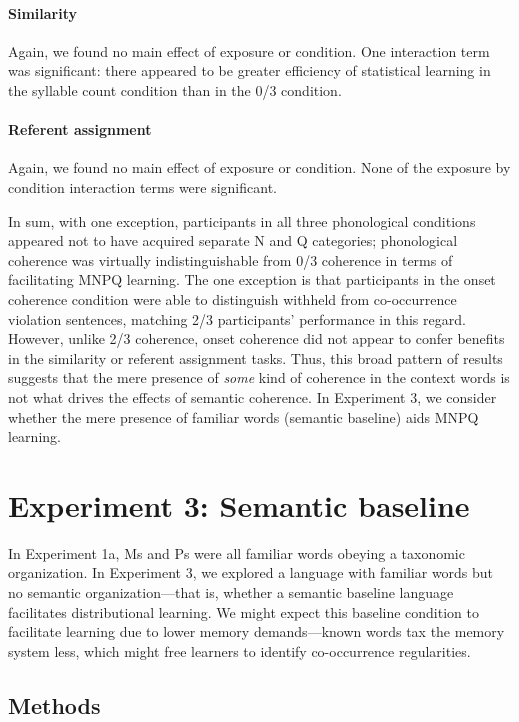 \documentclass[man,longtable,floatsintext]{my-apa6}
\begin{document}
\paragraph{Similarity}
Again, we found no main effect of exposure or condition. One interaction term was significant: there appeared to be greater efficiency of statistical learning in the syllable count condition than in the 0/3 condition.

\paragraph{Referent assignment}
Again, we found no main effect of exposure or condition. None of the exposure by condition interaction terms were significant.

In sum, with one exception, participants in all three phonological conditions appeared not to have acquired separate N and Q categories; phonological coherence was virtually indistinguishable from 0/3 coherence in terms of facilitating MNPQ learning. The one exception is that participants in the onset coherence condition were able to distinguish withheld from co-occurrence violation sentences, matching 2/3 participants' performance in this regard. However, unlike 2/3 coherence, onset coherence did not appear to confer benefits in the similarity or referent assignment tasks. Thus, this broad pattern of results suggests that the mere presence of \emph{some} kind of coherence in the context words is not what drives the effects of semantic coherence. In Experiment 3, we consider whether the mere presence of familiar words (semantic baseline) aids MNPQ learning.

\section{Experiment 3: Semantic baseline}

In Experiment 1a, Ms and Ps were all familiar words obeying a taxonomic organization. In Experiment 3, we explored a language with familiar words but no semantic organization---that is, whether a semantic baseline language facilitates distributional learning. We might expect this baseline condition to facilitate learning due to lower memory demands---known words tax the memory system less, which might free learners to identify co-occurrence regularities.

\subsection{Methods}
\end{document}
